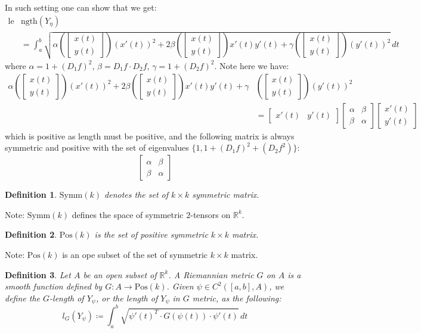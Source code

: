 \documentclass[15pt]{book}
\theoremstyle{break}
\theoremstyle{break}
\newtheorem{defn}{Definition}[corL]
\newcommand{\R}{\mathbb{R}}
\newcommand{\bmat}[1]{\begin{bmatrix} #1 \end{bmatrix}}
\newcommand{\note}{\color{red}Note: \color{black}}
\begin{document}
In such setting one can show that we get:
\begin{align*}
\text{le}&\text{ngth}\left(Y_{\eta}\right) \\
&= \int_a^b \sqrt{\alpha\left(\bmat{x\left(t\right)\\y\left(t\right)}\right)\left(x'\left(t\right)\right)^2 + 2\beta\left(\bmat{x\left(t\right) \\ y\left(t\right)}\right) x'\left(t\right) y'\left(t\right) + \gamma\left(\bmat{x\left(t\right) \\ y\left(t\right)}\right) \left(y'\left(t\right)\right)^2 }\, dt
\end{align*}
where $\alpha = 1+\left(D_1f\right)^2$, $\beta = D_1f \cdot D_2f$, $\gamma = 1+\left(D_2f\right)^2$. Note here we have:
\begin{align*}
\alpha\left(\bmat{x\left(t\right)\\y\left(t\right)}\right)\left(x'\left(t\right)\right)^2 + 2\beta\left(\bmat{x\left(t\right) \\ y\left(t\right)}\right) x'\left(t\right) y'\left(t\right) + \gamma&\left(\bmat{x\left(t\right) \\ y\left(t\right)}\right) 
\left(y'\left(t\right)\right)^2  \\
&= \bmat{x'\left(t\right) & y'\left(t\right)}\bmat{\alpha &\beta \\ \beta & \alpha} \bmat{x'\left(t\right) \\ y'\left(t\right)}
\end{align*}
which is positive as length must be positive, and the following matrix is always symmetric and positive with the set of eigenvalues $\{1, 1+(D_1f)^2 + (D_2f^2)\}$:
$$\bmat{\alpha &\beta \\ \beta & \alpha}$$  

\hfill\break
\begin{defn}
$\text{Symm}(k)$ denotes the set of $k\times k$ symmetric matrix. 
\end{defn}
\note $\text{Symm}(k)$ defines the space of symmetric $2$-tensors on $\R^k$. 

\begin{defn}
$\text{Pos}(k)$ is the set of positive symmetric $k\times k$ matrix.
\end{defn}
\note $\text{Pos}(k)$ is an ope subset of the set of symmetric $k\times k$ matrix.\\

\begin{defn}
Let $A$ be an open subset of $\R^k$. A Riemannian metric $G$ on $A$ is a smooth function defined by $G:A \to \text{Pos}(k)$. Given $\psi\in C^2([a,b],A)$, we define the $G$-length of $Y_\psi$, or the length of $Y_{\psi}$ in $G$ metric, as the following: 
$$l_G(Y_{\psi}) \coloneqq \int_a^b \sqrt{\psi'(t)^T \cdot G(\psi(t))\cdot \psi'(t)}\, dt$$
\end{defn}
\end{document}
